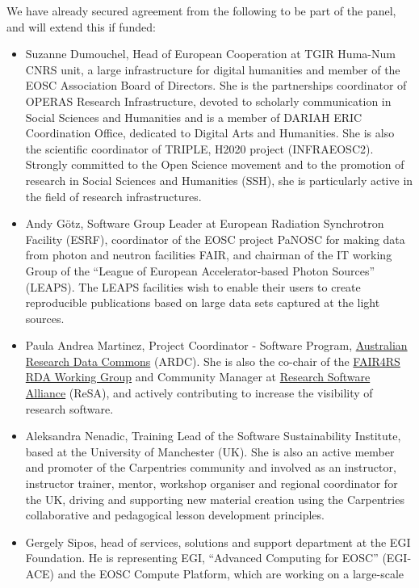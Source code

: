 We have already secured agreement from the following to be part of the panel,
and will extend this if funded:
\begin{itemize}
\item Suzanne Dumouchel, Head of European Cooperation at TGIR Huma-Num CNRS unit, a large infrastructure for
digital humanities and member of the EOSC Association Board of Directors. She is the partnerships coordinator
of OPERAS Research Infrastructure, devoted to scholarly communication in Social Sciences and Humanities and is a member of DARIAH ERIC Coordination Office,
dedicated to Digital Arts and Humanities. She is also the scientific coordinator of TRIPLE, H2020 project
(INFRAEOSC2). Strongly committed to the Open Science movement and to the promotion of research in Social Sciences
and Humanities (SSH), she is particularly active in the field of research infrastructures.
\item Andy Götz, Software Group Leader at European Radiation Synchrotron
  Facility (ESRF), coordinator of the EOSC project PaNOSC for making data from
  photon and neutron facilities FAIR, and chairman of the IT working Group of
  the ``League of European Accelerator-based Photon Sources'' (LEAPS). The LEAPS
  facilities wish to enable their users to create reproducible publications
  based on large data sets captured at the light sources.
\item Paula Andrea Martinez, Project Coordinator - Software Program, \href{https://ardc.edu.au/}{Australian Research Data Commons} (ARDC).
She is also the co-chair of the \href{https://www.rd-alliance.org/groups/fair-research-software-fair4rs-wg}{FAIR4RS RDA Working Group} and
Community Manager at \href{https://www.researchsoft.org/}{Research Software Alliance} (ReSA), and actively contributing
to increase the visibility of research software.
\item Aleksandra Nenadic, Training Lead of the Software Sustainability Institute,
based at the University of Manchester (UK). She is also an active member and
promoter of the Carpentries community and involved as an instructor,
instructor trainer, mentor, workshop organiser and regional coordinator
for the UK, driving and supporting new material creation using the
Carpentries collaborative and pedagogical lesson development principles.
\item Gergely Sipos, head of services, solutions and support department at the
  EGI Foundation. He is representing EGI, ``Advanced Computing for EOSC''
  (EGI-ACE) and the EOSC Compute Platform, which are working on a large-scale

\end{itemize}

